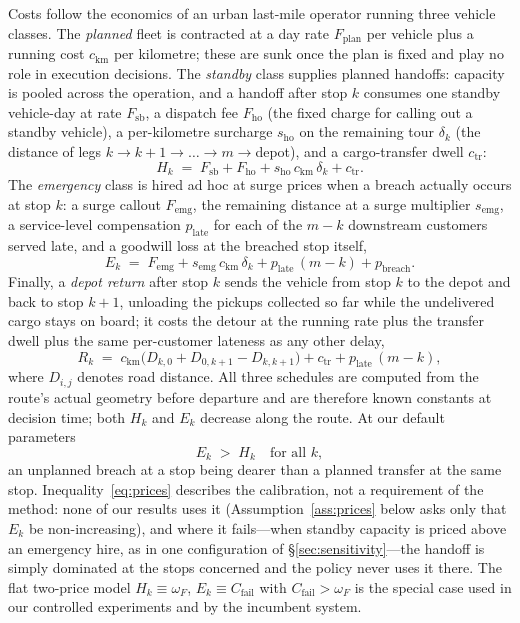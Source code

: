 \documentclass[preprint,authoryear,12pt]{elsarticle}
\theoremstyle{definition}
\theoremstyle{remark}
\begin{document}
Costs follow the economics of an urban last-mile operator running three
vehicle classes. The \emph{planned} fleet is contracted at a day rate
$F_{\mathrm{plan}}$ per vehicle plus a running cost $c_{\mathrm{km}}$
per kilometre; these are sunk once the plan is fixed and play no role in
execution decisions. The \emph{standby} class supplies planned handoffs:
capacity is pooled across the operation, and a handoff after stop $k$
consumes one standby vehicle-day at rate $F_{\mathrm{sb}}$, a dispatch
fee $F_{\mathrm{ho}}$ (the fixed charge for calling out a standby
vehicle), a per-kilometre surcharge $s_{\mathrm{ho}}$ on the remaining tour
$\delta_k$ (the distance of legs $k{\to}k{+}1{\to}\dots{\to}m{\to}$depot),
and a cargo-transfer dwell $c_{\mathrm{tr}}$:
\begin{equation}\label{eq:handoffprice}
  H_k \;=\; F_{\mathrm{sb}} + F_{\mathrm{ho}}
       + s_{\mathrm{ho}}\, c_{\mathrm{km}}\, \delta_k + c_{\mathrm{tr}} .
\end{equation}
The \emph{emergency} class is hired ad hoc at surge prices when a breach
actually occurs at stop $k$: a surge callout $F_{\mathrm{emg}}$, the
remaining distance at a surge multiplier $s_{\mathrm{emg}}$, a
service-level compensation $p_{\mathrm{late}}$ for each of the $m-k$
downstream customers served late, and a goodwill loss at the breached
stop itself,
\begin{equation}\label{eq:emergencyprice}
  E_k \;=\; F_{\mathrm{emg}}
       + s_{\mathrm{emg}}\, c_{\mathrm{km}}\, \delta_k
       + p_{\mathrm{late}}\,(m-k) + p_{\mathrm{breach}} .
\end{equation}
Finally, a \emph{depot return} after stop $k$ sends the vehicle from
stop $k$ to the depot and back to stop $k{+}1$, unloading the pickups
collected so far while the undelivered cargo stays on board; it costs
the detour at the running rate plus the transfer dwell plus the same
per-customer lateness as any other delay,
\begin{equation}\label{eq:restockprice}
  R_k \;=\; c_{\mathrm{km}}\bigl(D_{k,0} + D_{0,k+1} - D_{k,k+1}\bigr)
       + c_{\mathrm{tr}} + p_{\mathrm{late}}\,(m-k) ,
\end{equation}
where $D_{i,j}$ denotes road distance. All three schedules are computed
from the route's actual geometry before departure and are therefore
known constants at decision time; both $H_k$ and $E_k$ decrease along
the route. At our default parameters
\begin{equation}\label{eq:prices}
  E_k \;>\; H_k \quad\text{for all } k ,
\end{equation}
an unplanned breach at a stop being dearer than a planned transfer at
the same stop. Inequality~\eqref{eq:prices} describes the calibration,
not a requirement of the method: none of our results uses it
(Assumption~\ref{ass:prices} below asks only that $E_k$ be
non-increasing), and where it fails---when standby capacity is priced
above an emergency hire, as in one configuration of
\S\ref{sec:sensitivity}---the handoff is simply dominated at the stops
concerned and the policy never uses it there. The flat two-price model
$H_k \equiv \omega_F$, $E_k \equiv C_{\mathrm{fail}}$ with
$C_{\mathrm{fail}} > \omega_F$ is the special case used in our
controlled experiments and by the incumbent system.
\end{document}
